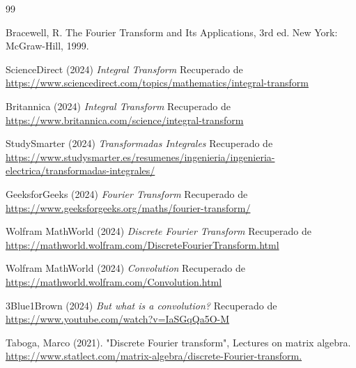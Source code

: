 \documentclass[12pt]{article}
\begin{document}
\begin{thebibliography}{99}

Bracewell, R. The Fourier Transform and Its Applications, 3rd ed. New York: McGraw-Hill, 1999.

ScienceDirect (2024) \textit{Integral Transform}
Recuperado de \url{https://www.sciencedirect.com/topics/mathematics/integral-transform}

Britannica (2024) \textit{Integral Transform}
Recuperado de \url{https://www.britannica.com/science/integral-transform}

StudySmarter (2024) \textit{Transformadas Integrales}
Recuperado de \url{https://www.studysmarter.es/resumenes/ingenieria/ingenieria-electrica/transformadas-integrales/}

GeeksforGeeks (2024) \textit{Fourier Transform}
Recuperado de \url{https://www.geeksforgeeks.org/maths/fourier-transform/}

Wolfram MathWorld (2024) \textit{Discrete Fourier Transform}
Recuperado de \url{https://mathworld.wolfram.com/DiscreteFourierTransform.html}

Wolfram MathWorld (2024) \textit{Convolution}
Recuperado de \url{https://mathworld.wolfram.com/Convolution.html}

3Blue1Brown (2024) \textit{But what is a convolution?}
Recuperado de \url{https://www.youtube.com/watch?v=IaSGqQa5O-M}

Taboga, Marco (2021). "Discrete Fourier transform", Lectures on matrix algebra. \url{https://www.statlect.com/matrix-algebra/discrete-Fourier-transform.}

 


\end{thebibliography}
\end{document}
